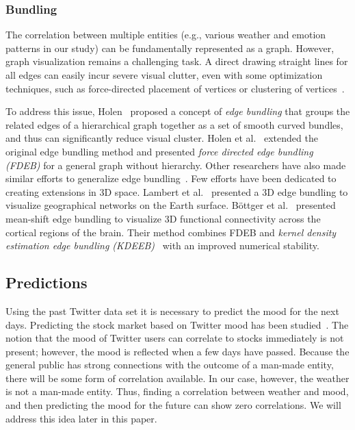 \subsubsection{Bundling}

The correlation between multiple entities (e.g., various weather and emotion patterns in our study) can be fundamentally represented as a graph. However, graph visualization remains a challenging task. A direct drawing straight lines for all edges can easily incur severe visual clutter, even with some optimization techniques, such as force-directed placement of vertices or clustering of vertices~\cite{KAUFMANN2001}.

To address this issue, Holen~\cite{holten2006hierarchical} proposed a concept of \emph{edge bundling} that groups the related edges of a hierarchical graph together as a set of smooth curved bundles, and thus can significantly reduce visual cluster. Holen et al.~\cite{holten2009force} extended the original edge bundling method and presented \emph{force directed edge bundling (FDEB)} for a general graph without hierarchy. Other researchers have also made similar efforts to generalize edge bundling~\cite{cui2008geometry,telea2010image,ersoy2011skeleton,gansner2011multilevel}. Few efforts have been dedicated to creating extensions in 3D space. Lambert et al.~\cite{5571244} presented a 3D edge bundling to visualize geographical networks on the Earth surface. B\"{o}ttger et al.~\cite{bottger2014three} presented mean-shift edge bundling to visualize 3D functional connectivity across the cortical regions of the brain. Their method combines FDEB and \emph{kernel density estimation edge bundling (KDEEB)}~\cite{hurter2012graph} with an improved numerical stability.

\subsection{Predictions}

Using the past Twitter data set it is necessary to predict the mood for the next days. Predicting the stock market based on Twitter mood has been studied~\cite{woodring2009multiscale}. The notion that the mood of Twitter users can correlate to stocks immediately is not present; however, the mood is reflected when a few days have passed. Because the general public has strong connections with the outcome of a man-made entity, there will be some form of correlation available. In our case, however, the weather is not a man-made entity. Thus, finding a correlation between weather and mood, and then predicting the mood for the future can show zero correlations. We will address this idea later in this paper. 